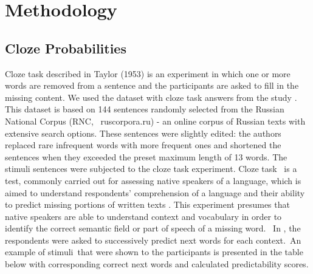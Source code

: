 \documentclass[a4paper]{article}
\begin{document}
\section{Methodology}

\subsection{Cloze Probabilities}

Cloze task described in Taylor (1953) is an experiment in which one or more words are removed from a sentence and the participants are asked to fill in the missing content. 
We used the dataset with cloze task answers from the study
\cite{laurinavichyute}. This dataset is based on 144 sentences
randomly selected from the Russian National Corpus (RNC,
 ruscorpora.ru) - an online corpus of Russian texts with extensive
search options. These sentences were slightly edited: the authors
replaced rare infrequent words with more frequent ones and shortened
the sentences when they exceeded the preset maximum length of 13
words. The stimuli sentences were subjected to the cloze task
experiment. Cloze task \cite{taylor:1953} is a test, commonly carried out
for assessing native speakers of a language, which is aimed to
understand respondents’ comprehension of a language and their ability
to predict missing portions of written texts \cite{laurinavichyute}. This experiment presumes that native speakers are able to understand context and vocabulary in order to identify the correct semantic field or part of speech of a missing word.
 In \cite{laurinavichyute}, the respondents were asked to successively predict next words for each context. An example of stimuli that were shown to the participants is presented in the table below with corresponding correct next words and calculated predictability scores.
\end{document}
